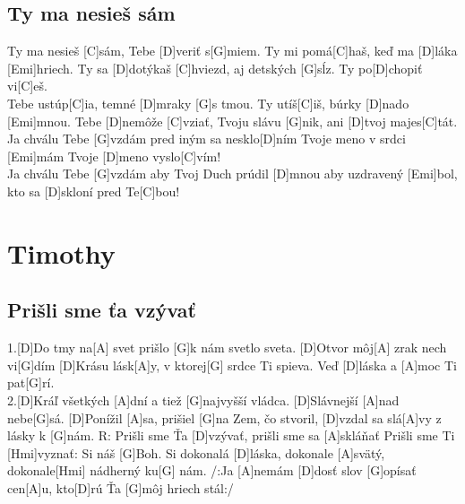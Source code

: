 \documentclass[10pt]{article}
\begin{document}
\begin{Large}
\begin{minipage}{\textwidth}
\subsection{Ty ma nesieš sám}
\begin{multicols*}{2}
\begin{guitar}	
	[G]Ty ma nesieš [C]sám, Tebe [D]veriť s[G]miem.
	Ty mi pomá[C]haš, keď ma [D]láka [Emi]hriech.
	Ty sa [D]dotýkaš [C]hviezd, aj detských [G]sĺz.
	Ty po[D]chopiť vi[C]eš.
	\\
	[G]Tebe ustúp[C]ia, temné [D]mraky [G]s tmou.
	Ty utíš[C]iš, búrky [D]nado [Emi]mnou.
	Tebe [D]nemôže [C]vziať, Tvoju slávu [G]nik,
	ani [D]tvoj majes[C]tát.
	\columnbreak
	[C]Ja chválu Tebe [G]vzdám
	pred iným sa nesklo[D]ním
	Tvoje meno v srdci [Emi]mám
	Tvoje [D]meno vyslo[C]vím!
	\\
	[C]Ja chválu Tebe [G]vzdám
	aby Tvoj Duch prúdil [D]mnou
	aby uzdravený [Emi]bol,
	kto sa [D]skloní pred Te[C]bou!
\end{guitar}
\end{multicols*}
\end{minipage}

\newpage

\begin{minipage}{\textwidth}
\section{Timothy}
\subsection{Prišli sme ťa vzývať}
\begin{multicols*}{2}
\begin{guitar}	
	1.[D]Do tmy na[A] svet 
	prišlo [G]k nám svetlo sveta.
	[D]Otvor môj[A] zrak nech vi[G]dím
	[D]Krásu lásk[A]y, v ktorej[G] srdce Ti spieva.
	Veď [D]láska a [A]moc Ti pat[G]rí.
	\\
	2.[D]Kráľ všetkých [A]dní 
	a tiež [G]najvyšší vládca.
	[D]Slávnejší [A]nad nebe[G]sá.
	[D]Ponížil [A]sa, prišiel [G]na Zem, čo stvoril,
	[D]vzdal sa slá[A]vy z lásky k [G]nám.
	\columnbreak
	R: Prišli sme Ťa [D]vzývať, 
	prišli sme sa [A]skláňať
	Prišli sme Ti [Hmi]vyznať: Si náš [G]Boh.
	Si dokonalá [D]láska, dokonale [A]svätý,
	dokonale[Hmi] nádherný ku[G] nám.
	/:Ja [A]nemám [D]dosť slov [G]opísať 
	cen[A]u, kto[D]rú Ťa [G]môj hriech stál:/
\end{guitar}
\end{multicols*}
\end{minipage}


\end{Large}
\end{document}
